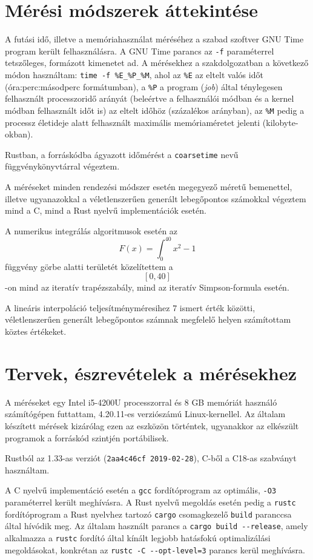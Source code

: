 
\section{Mérési módszerek áttekintése}

A futási idő, illetve a memóriahasználat méréséhez a szabad szoftver GNU Time program került felhasználásra. A GNU Time parancs az \lstinline{-f} paraméterrel tetszőleges, formázott kimenetet ad. A mérésekhez a szakdolgozatban a következő módon használtam: \lstinline{time -f %E_%P_%M}, ahol az \lstinline{%E} az eltelt valós időt (óra:perc:másodperc formátumban), a \lstinline{%P} a program (\textit{job}) által ténylegesen felhasznált processzoridő arányát (beleértve a felhasználói módban és a kernel módban felhasznált időt is) az eltelt időhöz (százalékos arányban), az \lstinline{%M} pedig a processz életideje alatt felhasznált maximális memóriaméretet jelenti (kilobyte-okban).

Rustban, a forráskódba ágyazott időmérést a \texttt{coarsetime} nevű függvénykönyvtárral végeztem.

A méréseket minden rendezési módszer esetén megegyező méretű bemenettel, illetve ugyanazokkal a véletlenszerűen generált lebegőpontos számokkal végeztem mind a C, mind a Rust nyelvű implementációk esetén.

A numerikus integrálás algoritmusok esetén az \[ F(x) = \int_0^{40} x^2 - 1 \] függvény görbe alatti területét közelítettem a \[\left[0, 40\right]\]-on mind az iteratív trapézszabály, mind az iteratív Simpson-formula esetén.

A lineáris interpoláció teljesítményméresihez 7 ismert érték közötti, véletlenszerűen generált lebegőpontos számnak megfelelő helyen számítottam köztes értékeket.

\section{Tervek, észrevételek a mérésekhez}

A méréseket egy Intel i5-4200U processzorral és 8 GB memóriát használó számítógépen futtattam, 4.20.11-es verziószámú Linux-kernellel. Az általam készített mérések kizárólag ezen az eszközön történtek, ugyanakkor az elkészült programok a forráskód szintjén portábilisek.

Rustból az 1.33-as verziót (\lstinline{2aa4c46cf 2019-02-28}), C-ből a C18-as szabványt használtam.

A C nyelvű implementáció esetén a \lstinline{gcc} fordítóprogram az optimális, \lstinline{-O3} paraméterrel került meghívásra. A Rust nyelvű megoldás esetén pedig a \lstinline{rustc} fordítóprogram a Rust nyelvhez tartozó \lstinline{cargo} csomagkezelő \lstinline{build} paranccsa által hívódik meg. Az általam használt parancs a \lstinline{cargo build --release}, amely alkalmazza a \lstinline{rustc} fordító által kínált legjobb hatásfokú optimalizálási megoldásokat, konkrétan az \lstinline{rustc -C --opt-level=3} parancs kerül meghívásra.
